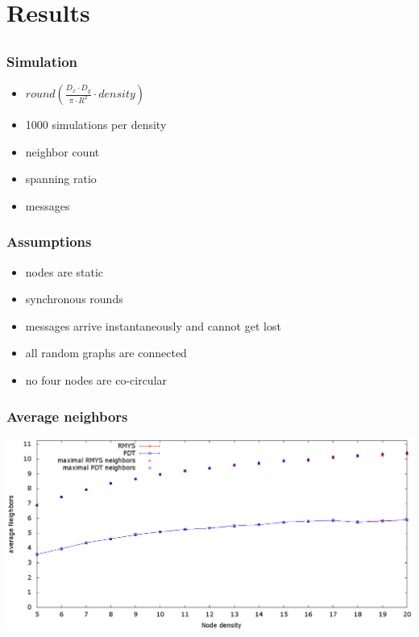 \documentclass[compress]{beamer}
\begin{document}
\section{Results}

\subsection{}

\begin{frame}
\frametitle{Simulation}
\begin{itemize}
\item $round(\frac{D_x \cdot D_y}{\pi \cdot R^2} \cdot density) $
\item 1000 simulations per density
\end{itemize}
\begin{itemize}
\item neighbor count
\item spanning ratio
\item messages
\end{itemize}
\end{frame}

\begin{frame}
\frametitle{Assumptions}
\begin{itemize}
\item nodes are static
\item synchronous rounds
\item messages arrive instantaneously and cannot get lost
\item all random graphs are connected
\item no four nodes are co-circular
\end{itemize}
\end{frame}

\begin{frame} 
\frametitle{Average neighbors}
\center	\includegraphics[width=1.0\linewidth]{RMYS_PDT_avrNeighbors.eps}
\end{frame}
\end{document}
